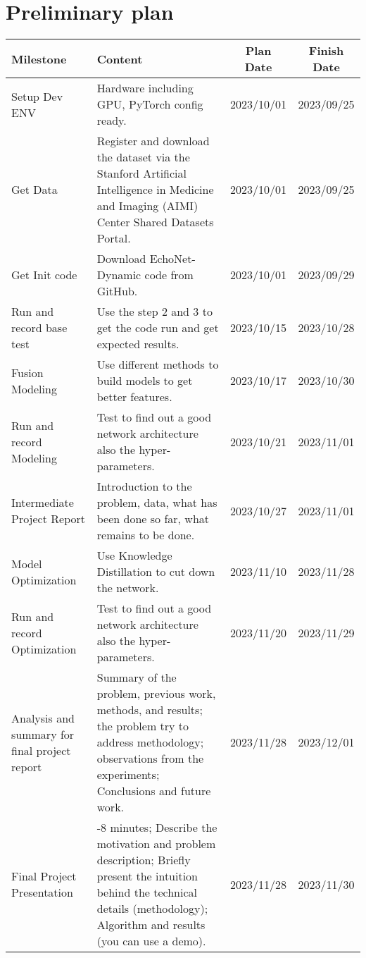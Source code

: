 \section{Preliminary plan}
\label{sec:formatting}

\noindent
\begin{minipage}{0.5\textwidth}
    \fontsize{7}{10}\selectfont
    \begin{tabular}{|>{\raggedright\arraybackslash}m{1cm}|>{\raggedright\arraybackslash}m{3cm}|c|c|}
        \hline
        \rowcolor{myblue} \color{white} Milestone & \color{white} Content & \color{white} Plan Date & \color{white} Finish Date \\
        \hline
        Setup Dev ENV & Hardware including GPU, PyTorch config ready. & 2023/10/01 & 2023/09/25\\
        \hline
        Get Data & Register and download the dataset via the Stanford Artificial Intelligence in Medicine and Imaging (AIMI) Center Shared Datasets Portal. & 2023/10/01 & 2023/09/25\\
        \hline
        Get Init code & Download EchoNet-Dynamic code from GitHub. & 2023/10/01 & 2023/09/29\\
        \hline
        Run and record base test & Use the step 2 and 3 to get the code run and get expected results. & 2023/10/15 & 2023/10/28\\
        \hline
        Fusion Modeling & Use different methods to build models to get better features. & 2023/10/17 & 2023/10/30\\
        \hline
        Run and record Modeling & Test to find out a good network architecture also the hyper-parameters. & 2023/10/21 & 2023/11/01\\
        \hline
        Intermediate Project Report & Introduction to the problem, data, what has been done so far, what remains to be done. & 2023/10/27 & 2023/11/01\\
        \hline
        Model Optimization & Use Knowledge Distillation to cut down the network. & 2023/11/10 & 2023/11/28\\
        \hline
        Run and record Optimization & Test to find out a good network architecture also the hyper-parameters. & 2023/11/20 & 2023/11/29\\
        \hline
        Analysis and summary for final project report & Summary of the problem, previous work, methods, and results; the problem try to address methodology; observations from the experiments; Conclusions and future work. & 2023/11/28 & 2023/12/01\\
        \hline
        Final Project Presentation & 5-8 minutes; Describe the motivation and problem description; Briefly present the intuition behind the technical details (methodology); Algorithm and results (you can use a demo). & 2023/11/28 & 2023/11/30\\
        \hline
    \end{tabular}
\end{minipage}%

